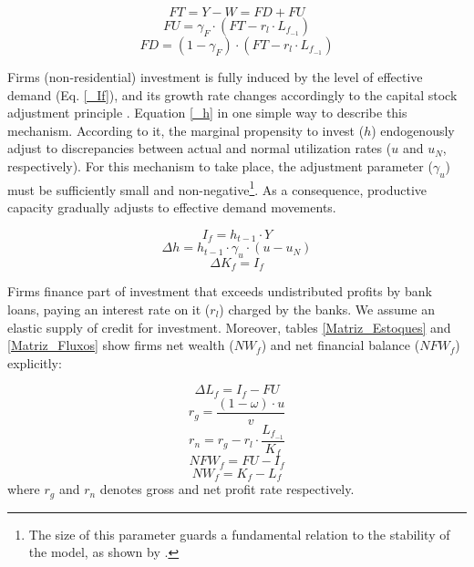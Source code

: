 \documentclass[11pt]{article}
\begin{document}
\begin{equation}
\label{_FT}
    FT = Y - W = FD + FU
\end{equation}
\begin{equation}
    FU = \gamma_F\cdot (FT - r_l\cdot L_{f_{-1}})
\end{equation}
\begin{equation}
    FD = (1-\gamma_F)\cdot (FT - r_l\cdot L_{f_{-1}})
\end{equation}

Firms (non-residential) investment is fully induced by the level of effective demand (Eq. \ref{_If}), and its growth rate changes accordingly to the capital stock adjustment principle \cite{freitas_growth_2015}.
Equation \ref{_h} in one simple way to describe this mechanism.
According to it, the marginal propensity to invest (\(h\)) endogenously adjust to discrepancies between actual and normal utilization rates (\(u\) and \(u_N\), respectively). 
For this mechanism to take place, the adjustment parameter (\(\gamma_u\)) must be sufficiently small and non-negative\footnote{The size of this parameter guards a fundamental relation to the stability of the model, as shown by \textcite{freitas_growth_2015}.}. 
As a consequence, productive capacity gradually adjusts to effective demand movements.

\begin{equation}
\label{_If}
    I_f = h_{t-1}\cdot Y
\end{equation}
\begin{equation}
\label{_h}
    \Delta h = h_{t-1}\cdot \gamma_u\cdot (u - u_N)
\end{equation}
\begin{equation}
    \Delta K_f = I_f
\end{equation}


Firms finance part of investment that exceeds undistributed profits by bank loans, paying an interest rate on it (\(r_l\)) charged by the banks. 
We assume an elastic supply of credit for investment. 
Moreover, tables \ref{Matriz_Estoques} and \ref{Matriz_Fluxos} show firms net wealth (\(NW_f\)) and net financial balance (\(NFW_f\)) explicitly:

\begin{equation}
\label{_Lf}
    \Delta L_f = I_f - FU
\end{equation}
\begin{equation}
\label{_rg}
r_g = \frac{(1-\omega)\cdot u}{v}
\end{equation}
\begin{equation}
\label{_rn}
r_n = r_g - r_l\cdot\frac{L_{f_{-1}}}{K_f}
\end{equation}
\begin{equation}
    NFW_f = FU - I_f
\end{equation}
\begin{equation}
    NW_f = K_f - L_f
\end{equation}
where \(r_g\) and \(r_n\) denotes gross and net profit rate respectively.
\end{document}
